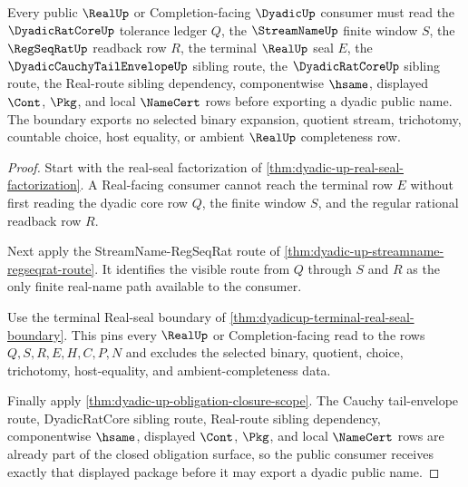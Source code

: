 \begin{theorem}
\label{thm:dyadic-public-consumer-boundary}
Every public $\RealUp$ or Completion-facing $\DyadicUp$ consumer must read the $\DyadicRatCoreUp$ tolerance ledger $Q$, the $\StreamNameUp$ finite window $S$, the $\RegSeqRatUp$ readback row $R$, the terminal $\RealUp$ seal $E$, the $\DyadicCauchyTailEnvelopeUp$ sibling route, the $\DyadicRatCoreUp$ sibling route, the Real-route sibling dependency, componentwise $\hsame$, displayed $\Cont$, $\Pkg$, and local $\NameCert$ rows before exporting a dyadic public name. The boundary exports no selected binary expansion, quotient stream, trichotomy, countable choice, host equality, or ambient $\RealUp$ completeness row.
\end{theorem}
\begin{proof}
Start with the real-seal factorization of \autoref{thm:dyadic-up-real-seal-factorization}. A Real-facing consumer cannot reach the terminal row $E$ without first reading the dyadic core row $Q$, the finite window $S$, and the regular rational readback row $R$.

Next apply the StreamName-RegSeqRat route of \autoref{thm:dyadic-up-streamname-regseqrat-route}. It identifies the visible route from $Q$ through $S$ and $R$ as the only finite real-name path available to the consumer.

Use the terminal Real-seal boundary of \autoref{thm:dyadicup-terminal-real-seal-boundary}. This pins every $\RealUp$ or Completion-facing read to the rows $Q,S,R,E,H,C,P,N$ and excludes the selected binary, quotient, choice, trichotomy, host-equality, and ambient-completeness data.

Finally apply \autoref{thm:dyadic-up-obligation-closure-scope}. The Cauchy tail-envelope route, DyadicRatCore sibling route, Real-route sibling dependency, componentwise $\hsame$, displayed $\Cont$, $\Pkg$, and local $\NameCert$ rows are already part of the closed obligation surface, so the public consumer receives exactly that displayed package before it may export a dyadic public name.
\end{proof}


